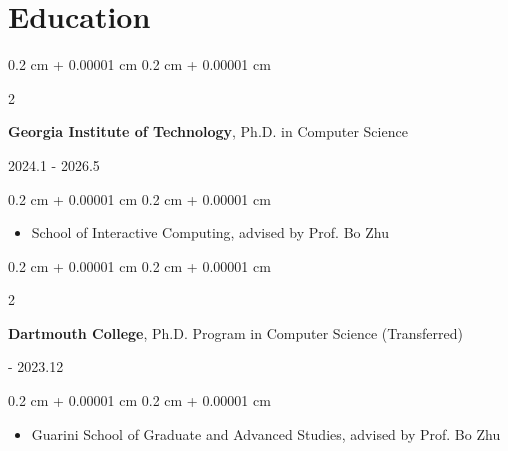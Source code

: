 \documentclass[10pt, letterpaper]{article}
\newenvironment{highlights}{
    \begin{itemize}[
        topsep=0.10 cm,
        parsep=0.10 cm,
        partopsep=0pt,
        itemsep=0pt,
        leftmargin=0.4 cm + 10pt
    ]
}{
    \end{itemize}
} %
\newenvironment{onecolentry}{
    \begin{adjustwidth}{
        0.2 cm + 0.00001 cm
    }{
        0.2 cm + 0.00001 cm
    }
}{
    \end{adjustwidth}
} %
\newenvironment{twocolentry}[2][]{
    \onecolentry
    \def\secondColumn{#2}
    \setcolumnwidth{\fill, 4.5 cm}
    \begin{paracol}{2}
}{
    \switchcolumn \raggedleft \secondColumn
    \end{paracol}
    \endonecolentry
} %
\let\hrefWithoutArrow\href
\renewcommand{\href}[2]{\hrefWithoutArrow{#1}{\ifthenelse{\equal{#2}{}}{ }{#2 }\raisebox{.15ex}{\footnotesize \faExternalLink*}}}
\begin{document}
    \section{Education}

        \begin{twocolentry}{
            
            
        2024.1 - 2026.5}
            \textbf{Georgia Institute of Technology}, Ph.D. in Computer Science 

        \end{twocolentry}

        \vspace{0.10 cm}
        \begin{onecolentry}
            \begin{highlights}
                \item School of Interactive Computing, advised by Prof. Bo Zhu
            \end{highlights}
        \end{onecolentry}

        \begin{twocolentry}{
        2020.9 - 2023.12}
            \textbf{Dartmouth College}, Ph.D. Program in Computer Science (Transferred)
        \end{twocolentry}
        \vspace{0.10 cm}
        \begin{onecolentry}
            \begin{highlights}
                \item Guarini School of Graduate and Advanced Studies, advised by Prof. Bo Zhu
            \end{highlights}
        \end{onecolentry}
\end{document}
